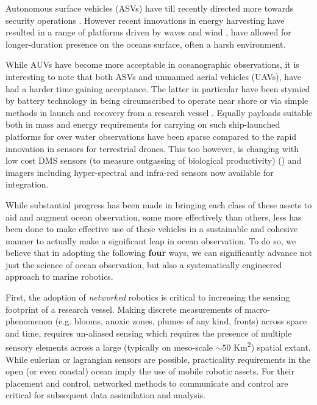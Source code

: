 Autonomous surface vehicles (ASVs) have till recently directed more
towards security operations \cite{wolf10}. However recent innovations
in energy harvesting have resulted in a range of platforms driven by
waves \cite{waveglider,verfuss19} and wind \cite{gentemann20,ghani14},
have allowed for longer-duration presence on the oceans surface, often
a harsh environment.

While AUVs have become more acceptable in oceanographic observations,
it is interesting to note that both ASVs and unmanned aerial vehicles
(UAVs), have had a harder time gaining acceptance. The latter in
particular have been stymied by battery technology in being
circumscribed to operate near shore or via simple methods in launch
and recovery from a research vessel \cite{Ferreira2018}. Equally
payloads suitable both in mass and energy requirements for carrying on
such ship-launched platforms for over water observations have been
sparse compared to the rapid innovation in sensors for terrestrial
drones. This too however, is changing with low cost DMS sensors (to
measure outgassing of biological productivity) () and imagers
including hyper-spectral \cite{sigernes18} and infra-red sensors now
available for integration.

While substantial progress has been made in bringing each class of
these assets to aid and augment ocean observation, some more
effectively than others, less has been done to make effective use of
these vehicles in a sustainable and cohesive manner to actually make a
significant leap in ocean observation. To do so, we believe that in
adopting the following \textbf{four} ways, we can significantly
advance not just the science of ocean observation, but also a
systematically engineered approach to marine robotics.

First, the adoption of \emph{networked} robotics is critical to
increasing the sensing footprint of a research vessel. Making discrete
measurements of macro-phenomenon (e.g. blooms, anoxic zones, plumes of
any kind, fronts) across space and time, requires un-aliased sensing
which requires the presence of multiple sensory elements across a
large (typically on meso-scale $\sim 50$ Km\textsuperscript{2})
spatial extant. While eulerian or lagrangian sensors are possible,
practicality requirements in the open (or even coastal) ocean imply
the use of mobile robotic assets. For their placement and control,
networked methods to communicate and control are critical for
subsequent data assimilation and analysis.

